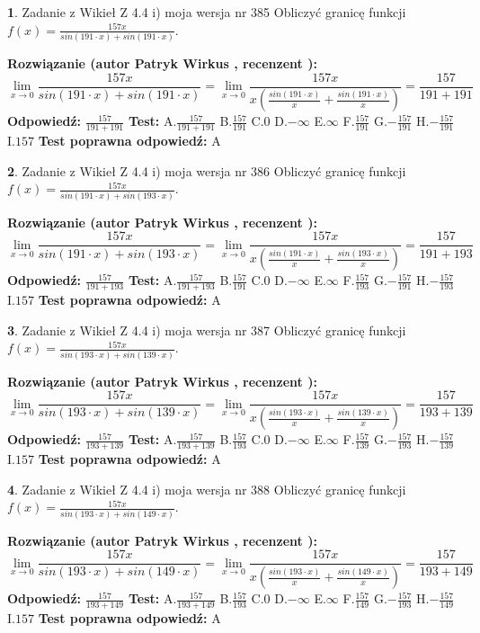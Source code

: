 \documentclass[12pt, a4paper]{article}
\theoremstyle{definition} %
\newtheorem{zad}{}
\newcommand{\zadStart}[1]{\begin{zad}#1\newline}
\newcommand{\zadStop}{\end{zad}}
\newcommand{\rozwStart}[2]{\noindent \textbf{Rozwiązanie (autor #1 , recenzent #2): }\newline}
\newcommand{\rozwStop}{\newline}
\newcommand{\odpStart}{\noindent \textbf{Odpowiedź:}\newline}
\newcommand{\odpStop}{\newline}
\newcommand{\testStart}{\noindent \textbf{Test:}\newline}
\newcommand{\testStop}{\newline}
\newcommand{\kluczStart}{\noindent \textbf{Test poprawna odpowiedź:}\newline}
\newcommand{\kluczStop}{\newline}
\begin{document}
\zadStart{Zadanie z Wikieł Z 4.4 i) moja wersja nr 385}
Obliczyć granicę funkcji $f(x)=\frac{157x}{sin(191\cdot x) +sin(191\cdot x)}$.
\zadStop
\rozwStart{Patryk Wirkus}{}
$$\lim\limits_{x\to 0}\frac{157x}{sin(191\cdot x) +sin(191\cdot x)}=\lim\limits_{x\to 0}\frac{157x}{x(\frac{sin(191\cdot x)}{x}+\frac{sin(191\cdot x)}{x})}=\frac{157}{191+191}$$
\rozwStop
\odpStart
$\frac{157}{191+191}$
\odpStop
\testStart
A.$\frac{157}{191+191}$
B.$\frac{157}{191}$
C.$0$
D.$-\infty$
E.$\infty$
F.$\frac{157}{191}$
G.$-\frac{157}{191}$
H.$-\frac{157}{191}$
I.$157$
\testStop
\kluczStart
A
\kluczStop



\zadStart{Zadanie z Wikieł Z 4.4 i) moja wersja nr 386}
Obliczyć granicę funkcji $f(x)=\frac{157x}{sin(191\cdot x) +sin(193\cdot x)}$.
\zadStop
\rozwStart{Patryk Wirkus}{}
$$\lim\limits_{x\to 0}\frac{157x}{sin(191\cdot x) +sin(193\cdot x)}=\lim\limits_{x\to 0}\frac{157x}{x(\frac{sin(191\cdot x)}{x}+\frac{sin(193\cdot x)}{x})}=\frac{157}{191+193}$$
\rozwStop
\odpStart
$\frac{157}{191+193}$
\odpStop
\testStart
A.$\frac{157}{191+193}$
B.$\frac{157}{191}$
C.$0$
D.$-\infty$
E.$\infty$
F.$\frac{157}{193}$
G.$-\frac{157}{191}$
H.$-\frac{157}{193}$
I.$157$
\testStop
\kluczStart
A
\kluczStop



\zadStart{Zadanie z Wikieł Z 4.4 i) moja wersja nr 387}
Obliczyć granicę funkcji $f(x)=\frac{157x}{sin(193\cdot x) +sin(139\cdot x)}$.
\zadStop
\rozwStart{Patryk Wirkus}{}
$$\lim\limits_{x\to 0}\frac{157x}{sin(193\cdot x) +sin(139\cdot x)}=\lim\limits_{x\to 0}\frac{157x}{x(\frac{sin(193\cdot x)}{x}+\frac{sin(139\cdot x)}{x})}=\frac{157}{193+139}$$
\rozwStop
\odpStart
$\frac{157}{193+139}$
\odpStop
\testStart
A.$\frac{157}{193+139}$
B.$\frac{157}{193}$
C.$0$
D.$-\infty$
E.$\infty$
F.$\frac{157}{139}$
G.$-\frac{157}{193}$
H.$-\frac{157}{139}$
I.$157$
\testStop
\kluczStart
A
\kluczStop



\zadStart{Zadanie z Wikieł Z 4.4 i) moja wersja nr 388}
Obliczyć granicę funkcji $f(x)=\frac{157x}{sin(193\cdot x) +sin(149\cdot x)}$.
\zadStop
\rozwStart{Patryk Wirkus}{}
$$\lim\limits_{x\to 0}\frac{157x}{sin(193\cdot x) +sin(149\cdot x)}=\lim\limits_{x\to 0}\frac{157x}{x(\frac{sin(193\cdot x)}{x}+\frac{sin(149\cdot x)}{x})}=\frac{157}{193+149}$$
\rozwStop
\odpStart
$\frac{157}{193+149}$
\odpStop
\testStart
A.$\frac{157}{193+149}$
B.$\frac{157}{193}$
C.$0$
D.$-\infty$
E.$\infty$
F.$\frac{157}{149}$
G.$-\frac{157}{193}$
H.$-\frac{157}{149}$
I.$157$
\testStop
\kluczStart
A
\kluczStop
\end{document}
